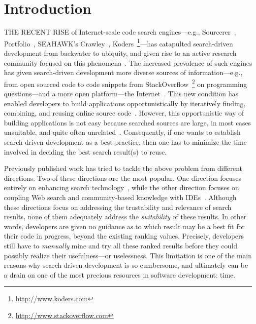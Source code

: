 \chapter{Introduction}{}
\label{sec:intro}

\lettrine[lraise=0.1, nindent=0em, slope=-.5em]{T} {HE RECENT RISE} of Internet-scale code search engines---e.g., Sourcerer~\cite{Bajracharya:2006vn}, Portfolio~\cite{McMillan:2011wq}, SEAHAWK's Crawley~\cite{Bacchelli:2012dl}, Koders~\footnote{\url{http://www.koders.com}}---has catapulted search-driven development from backwater to ubiquity, and given rise to an active research community focused on this phenomena~\cite{Bajracharya:2009fj, Bajracharya:2010iy, Bajracharya:2011kw}. The increased prevalence of such engines has given search-driven development more diverse sources of information---e.g., from open sourced code to code snippets from StackOverflow~\footnote{\url{http://www.stackoverflow.com}} on programming questions---and a more open platform---the Internet~\cite{GallardoValencia:2009gr, GallardoValencia:2010ij, Ying:2012tr}. This new condition has enabled developers to build applications opportunistically by iteratively finding, combining, and reusing online source code~\cite{Brandt:2008wi, Brandt:2009jb, Ying:2012tr}. However, this opportunistic way of building applications is not easy because searched sources are large, in most cases unsuitable, and quite often unrelated~\cite{GallardoValencia:2009gr}. Consequently, if one wants to establish search-driven development as a best practice, then one has to minimize the time involved in deciding the best search result(s) to reuse.

Previously published work has tried to tackle the above problem from different directions. Two of these directions are the most popular. One direction focuses entirely on enhancing search technology~\cite{Bajracharya:2010um, Gysin:2010kt, Mandelin:2005uj, McMillan:2011cm, McMillan:2012dj}, while the other direction focuses on coupling Web search and community-based knowledge with IDEs~\cite{Bacchelli:2012dl, Brandt:2010tp, Hartmann:2010hx, Hoffmann:2007wo, Wightman:2012gc}. Although these directions focus on addressing the trustability and relevance of search results, none of them adequately address the \emph{suitability} of these results. In other words, developers are given no guidance as to which result may be a best fit for their code in progress, beyond the existing ranking values. Precisely, developers still have to \emph{manually} mine and try all these ranked results before they could possibly realize their usefulness---or uselessness. This limitation is one of the main reasons why search-driven development is so cumbersome, and ultimately can be a drain on one of the most precious resources in software development: time.

